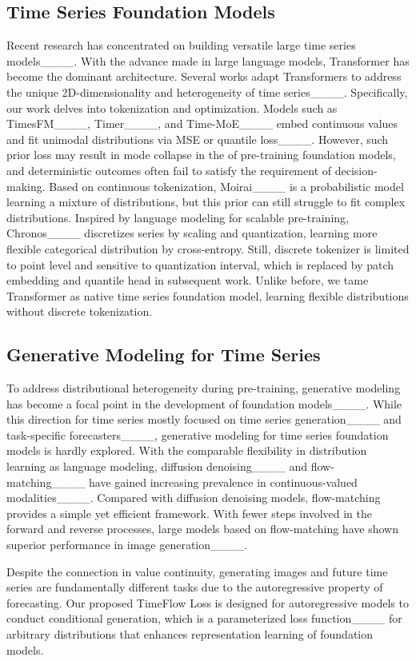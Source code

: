 \subsection{Time Series Foundation Models}
Recent research has concentrated on building versatile large time series models____. With the advance made in large language models, Transformer has become the dominant architecture. Several works adapt Transformers to address the unique 2D-dimensionality and heterogeneity of time series____. Specifically, our work delves into tokenization and optimization. Models such as TimesFM____, Timer____, and Time-MoE____ embed continuous values and fit unimodal distributions via MSE or quantile loss____. However, such prior loss may result in mode collapse in the of pre-training foundation models, and deterministic outcomes often fail to satisfy the requirement of decision-making. Based on continuous tokenization, Moirai____ is a probabilistic model learning a mixture of distributions, but this prior can still struggle to fit complex distributions. Inspired by language modeling for scalable pre-training, Chronos____ discretizes series by scaling and quantization, learning more flexible categorical distribution by cross-entropy. Still, discrete tokenizer is limited to point level and sensitive to quantization interval, which is replaced by patch embedding and quantile head in subsequent work. Unlike before, we tame Transformer as native time series foundation model, learning flexible distributions without discrete tokenization.

\subsection{Generative Modeling for Time Series}
To address distributional heterogeneity during pre-training, generative modeling has become a focal point in the development of foundation models____. While this direction for time series mostly focused on time series generation____ and task-specific forecasters____, generative modeling for time series foundation models is hardly explored.
With the comparable flexibility in distribution learning as language modeling, diffusion denoising____ and flow-matching____ have gained increasing prevalence in continuous-valued modalities____. Compared with diffusion denoising models, flow-matching provides a simple yet efficient framework. With fewer steps involved in the forward and reverse processes, large models based on flow-matching have shown superior performance in image generation____.

Despite the connection in value continuity, generating images and future time series are fundamentally different tasks due to the autoregressive property of forecasting. Our proposed TimeFlow Loss is designed for autoregressive models to conduct conditional generation, which is a parameterized loss function____ for arbitrary distributions that enhances representation learning of foundation models.